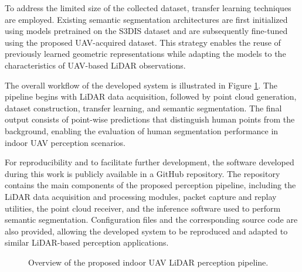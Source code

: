 To address the limited size of the collected dataset, transfer learning techniques are employed. Existing semantic segmentation architectures are first initialized using models pretrained on the S3DIS dataset and are subsequently fine-tuned using the proposed UAV-acquired dataset. This strategy enables the reuse of previously learned geometric representations while adapting the models to the characteristics of UAV-based LiDAR observations.

The overall workflow of the developed system is illustrated in Figure \ref{fig:system_overview}. The pipeline begins with LiDAR data acquisition, followed by point cloud generation, dataset construction, transfer learning, and semantic segmentation. The final output consists of point-wise predictions that distinguish human points from the background, enabling the evaluation of human segmentation performance in indoor UAV perception scenarios.

For reproducibility and to facilitate further development, the software developed during this work is publicly available in a GitHub repository. The repository contains the main components of the proposed perception pipeline, including the LiDAR data acquisition and processing modules, packet capture and replay utilities, the point cloud receiver, and the inference software used to perform semantic segmentation. Configuration files and the corresponding source code are also provided, allowing the developed system to be reproduced and adapted to similar LiDAR-based perception applications.\cite{github_lidar}


\begin{figure}[htbp]
\centering
{}
\caption{Overview of the proposed indoor UAV LiDAR perception pipeline.}
\label{fig:system_overview}
\end{figure}

